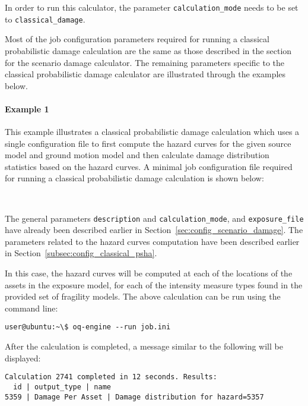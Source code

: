 In order to run this calculator, the parameter \Verb+calculation_mode+ needs
to be set to \Verb+classical_damage+.

Most of the job configuration parameters required for running a classical
probabilistic damage calculation are the same as those described in the
section for the scenario damage calculator. The remaining parameters specific
to the classical probabilistic damage calculator are illustrated through the
examples below.

\paragraph{Example 1}

This example illustrates a classical probabilistic damage calculation which
uses a single configuration file to first compute the hazard curves for the
given source model and ground motion model and then calculate damage
distribution statistics based on the hazard curves. A minimal job
configuration file required for running a classical probabilistic damage
calculation is shown below:

\inputminted[firstline=1,firstnumber=1,fontsize=\footnotesize,frame=single,linenos,bgcolor=lightgray,label=job.ini]{ini}{oqum/risk/verbatim/config_classical_damage_combined.ini}\\

The general parameters \Verb+description+ and \Verb+calculation_mode+, and
\Verb+exposure_file+ have already been described earlier in
Section~\ref{sec:config_scenario_damage}. The parameters related to the
hazard curves computation have been described earlier in
Section~\ref{subsec:config_classical_psha}.

In this case, the hazard curves will be computed at each of the locations of
the assets in the exposure model, for each of the intensity measure types
found in the provided set of fragility models. The above calculation can be
run using the command line:

\begin{Verbatim}[frame=single, commandchars=\\\{\}, samepage=true]
user@ubuntu:~\$ oq-engine --run job.ini
\end{Verbatim}

After the calculation is completed, a message similar to the following will be
displayed:

\begin{Verbatim}[frame=single, commandchars=\\\{\}, samepage=true]
Calculation 2741 completed in 12 seconds. Results:
  id | output_type | name
5359 | Damage Per Asset | Damage distribution for hazard=5357
\end{Verbatim}


